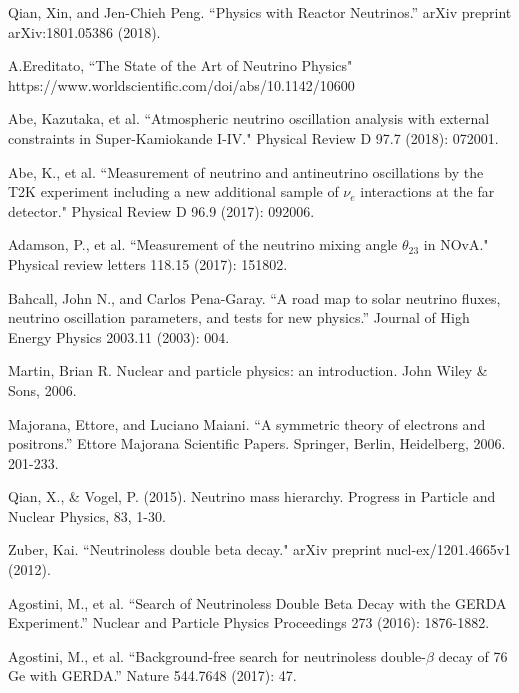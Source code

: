 \documentclass[preprint,12pt]{elsarticle}
\numberwithin{equation}{section}
\begin{document}
\begin{thebibliography}{00}
 Qian, Xin, and Jen-Chieh Peng. ``Physics with Reactor Neutrinos.'' arXiv preprint arXiv:1801.05386 (2018).

 A.Ereditato, ``The State of the Art of Neutrino Physics" https://www.worldscientific.com/doi/abs/10.1142/10600

 Abe, Kazutaka, et al. ``Atmospheric neutrino oscillation analysis with external constraints in Super-Kamiokande I-IV." Physical Review D 97.7 (2018): 072001.

 Abe, K., et al. ``Measurement of neutrino and antineutrino oscillations by the T2K experiment including a new additional sample of $\nu_e$ interactions at the far detector." Physical Review D 96.9 (2017): 092006.

 Adamson, P., et al. ``Measurement of the neutrino mixing angle $\theta_{23}$ in NOvA." Physical review letters 118.15 (2017): 151802.


 Bahcall, John N., and Carlos Pena-Garay. ``A road map to solar neutrino fluxes, neutrino oscillation parameters, and tests for new physics.'' Journal of High Energy Physics 2003.11 (2003): 004.

 Martin, Brian R. Nuclear and particle physics: an introduction. John Wiley \& Sons, 2006.

 Majorana, Ettore, and Luciano Maiani. ``A symmetric theory of electrons and positrons.'' Ettore Majorana Scientific Papers. Springer, Berlin, Heidelberg, 2006. 201-233.

 Qian, X., \& Vogel, P. (2015). Neutrino mass hierarchy. Progress in Particle and Nuclear Physics, 83, 1-30.



 Zuber, Kai. ``Neutrinoless double beta decay." arXiv preprint nucl-ex/1201.4665v1 (2012).

 Agostini, M., et al. ``Search of Neutrinoless Double Beta Decay with the GERDA Experiment.'' Nuclear and Particle Physics Proceedings 273 (2016): 1876-1882. 

 Agostini, M., et al. ``Background-free search for neutrinoless double-$\beta$ decay of 76 Ge with GERDA.'' Nature 544.7648 (2017): 47.


\end{thebibliography}
\end{document}
